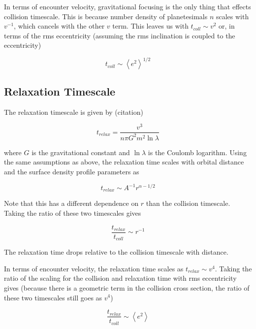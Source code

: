 \documentclass[onecolumn]{aastex63}
\begin{document}
In terms of encounter velocity, gravitational focusing is the only thing that effects collision timescale. This is because number density of planetesimals $n$ scales with $v^{-1}$, which cancels with the other $v$ term. This leaves us with $t_{coll} \sim v^{2}$ or, in terms of the rms eccentricity (assuming the rms inclination is coupled to the eccentricity)

\begin{equation}
    t_{coll} \sim \left< e^{2} \right>^{1/2}
\end{equation}

\subsection{Relaxation Timescale}

The relaxation timescale is given by (citation)

\begin{equation}
    t_{relax} = \frac{v^3}{n \pi G^{2} m^{2} \ln \lambda}
\end{equation}

\noindent where $G$ is the gravitational constant and $\ln \lambda$ is the Coulomb logarithm. Using the same assumptions as above, the relaxation time scales with orbital distance and the surface density profile parameters as

\begin{equation}
    t_{relax} \sim A^{-1} r^{\alpha - 1/2}
\end{equation}

Note that this has a different dependence on $r$ than the collision timescale. Taking the ratio of these two timescales gives

\begin{equation}
    \frac{t_{relax}}{t_{coll}} \sim r^{-1}
\end{equation}

The relaxation time drops relative to the collision timescale with distance.

In terms of encounter velocity, the relaxation time scales as $t_{relax} \sim v^{4}$. Taking the ratio of the scaling for the collision and relaxation time with rms eccentricity gives (because there is a geometric term in the collision cross section, the ratio of these two timescales still goes as $v^{4}$)

\begin{equation}
    \frac{t_{relax}}{t_{coll}} \sim \left< e^{2} \right>
\end{equation}
\end{document}
